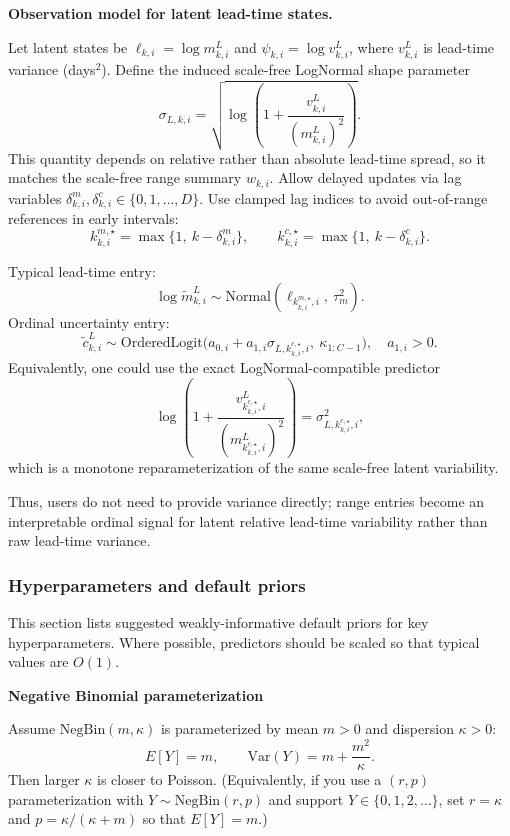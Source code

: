 \documentclass[11pt]{article}
\begin{document}
\textbf{Observation model for latent lead-time states.}

Let latent states be $\ell_{k,i}=\log m^L_{k,i}$ and $\psi_{k,i}=\log v^L_{k,i}$, where $v^L_{k,i}$ is lead-time variance (days$^2$).
Define the induced scale-free LogNormal shape parameter
\[
  \sigma_{L,k,i}=\sqrt{\log\!\left(1+\frac{v^L_{k,i}}{(m^L_{k,i})^2}\right)}.
\]
This quantity depends on relative rather than absolute lead-time spread, so it matches the scale-free range summary $w_{k,i}$.
Allow delayed updates via lag variables $\delta^{m}_{k,i},\delta^{c}_{k,i}\in\{0,1,\dots,D\}$.
Use clamped lag indices to avoid out-of-range references in early intervals:
\[
  k^{m,\star}_{k,i}=\max\{1,\ k-\delta^{m}_{k,i}\},\qquad
  k^{c,\star}_{k,i}=\max\{1,\ k-\delta^{c}_{k,i}\}.
\]

Typical lead-time entry:
\[
  \log \tilde m^L_{k,i} \sim \text{Normal}(\ell_{k^{m,\star}_{k,i},i},\ \tau_m^2).
\]
Ordinal uncertainty entry:
\[
  \tilde c^L_{k,i}\sim\text{OrderedLogit}\!\bigl(a_{0,i}+a_{1,i}\sigma_{L,k^{c,\star}_{k,i},i},\ \kappa_{1:C-1}\bigr),\quad a_{1,i}>0.
\]
Equivalently, one could use the exact LogNormal-compatible predictor
\[
  \log\!\left(1+\frac{v^L_{k^{c,\star}_{k,i},i}}{(m^L_{k^{c,\star}_{k,i},i})^2}\right)=\sigma^2_{L,k^{c,\star}_{k,i},i},
\]
which is a monotone reparameterization of the same scale-free latent variability.

Thus, users do not need to provide variance directly; range entries become an interpretable ordinal signal for latent relative lead-time variability rather than raw lead-time variance.

\subsubsection*{Hyperparameters and default priors}\label{sec:hyperparams}

This section lists suggested weakly-informative default priors for key hyperparameters.
Where possible, predictors should be scaled so that typical values are $O(1)$.

\textbf{Negative Binomial parameterization}

Assume $\text{NegBin}(m,\kappa)$ is parameterized by mean $m>0$ and dispersion $\kappa>0$:
\[
  E[Y]=m,\qquad \mathrm{Var}(Y)=m + \frac{m^2}{\kappa}.
\]
Then larger $\kappa$ is closer to Poisson.
(Equivalently, if you use a $(r,p)$ parameterization with $Y\sim\text{NegBin}(r,p)$ and support $Y\in\{0,1,2,\dots\}$, set
$r=\kappa$ and $p=\kappa/(\kappa+m)$ so that $E[Y]=m$.)
\end{document}
